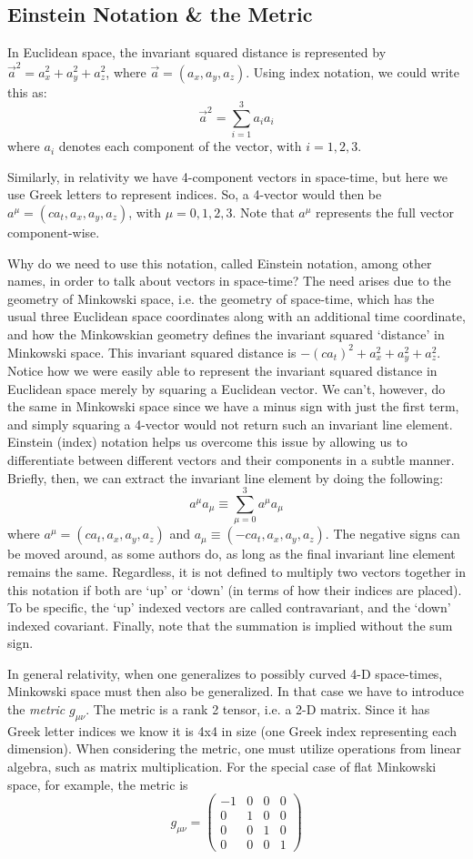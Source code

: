 \documentclass[12pt]{revtex4}
\begin{document}
\subsection{Einstein Notation \& the Metric} \label{einstein}
In Euclidean space, the invariant squared distance is represented by $\vec{a}^2=a_x^2 + a_y^2 + a_z^2$, where $\vec{a}=(a_x,a_y,a_z)$. Using index notation, we could write this as:
\[ \vec{a}^2 = \sum_{i=1}^{3} a_ia_i\]
where $a_i$ denotes each component of the vector, with $i=1,2,3$.

Similarly, in relativity we have 4-component vectors in space-time, but here we use Greek letters to represent indices. So, a 4-vector would then be $a^\mu=(ca_t,a_x,a_y,a_z)$, with $\mu=0,1,2,3$. Note that $a^\mu$ represents the full vector component-wise. 

Why do we need to use this notation, called Einstein notation, among other names, in order to talk about vectors in space-time? The need arises due to the geometry of Minkowski space, i.e. the geometry of space-time, which has the usual three Euclidean space coordinates along with an additional time coordinate, and how the Minkowskian geometry defines the invariant squared `distance' in Minkowski space. This invariant squared distance is $-(ca_t)^2+a_x^2+a_y^2+a_z^2$. Notice how we were easily able to represent the invariant squared distance in Euclidean space merely by squaring a Euclidean vector. We can't, however, do the same in Minkowski space since we have a minus sign with just the first term, and simply squaring a 4-vector would not return such an invariant line element. Einstein (index) notation helps us overcome this issue by allowing us to differentiate between different vectors and their components in a subtle manner. Briefly, then, we can extract the invariant line element by doing the following:
\[ a^\mu a_\mu \equiv \sum_{\mu=0}^{3} a^\mu a_\mu\]
where $a^\mu=(ca_t,a_x,a_y,a_z)$ and $a_\mu\equiv(-ca_t,a_x,a_y,a_z)$. The negative signs can be moved around, as some authors do, as long as the final invariant line element remains the same. Regardless, it is not defined to multiply two vectors together in this notation if both are `up' or `down' (in terms of how their indices are placed). To be specific, the `up' indexed vectors are called contravariant, and the `down' indexed covariant. Finally, note that the summation is implied without the sum sign.

In general relativity, when one generalizes to possibly curved 4-D space-times, Minkowski space must then also be generalized. In that case we have to introduce the \textit{metric} $g_{\mu\nu}$. The metric is a rank 2 tensor, i.e. a 2-D matrix. Since it has Greek letter indices we know it is 4x4 in size (one Greek index representing each dimension). When considering the metric, one must utilize operations from linear algebra, such as matrix multiplication.
For the special case of flat Minkowski space, for example, the metric is
\[ g_{\mu\nu} = \begin{pmatrix}
-1 & 0 & 0 & 0 \\ 
0 & 1 & 0 & 0 \\ 
0 & 0 & 1 & 0 \\ 
0 & 0 & 0 & 1
\end{pmatrix} \]
\end{document}
